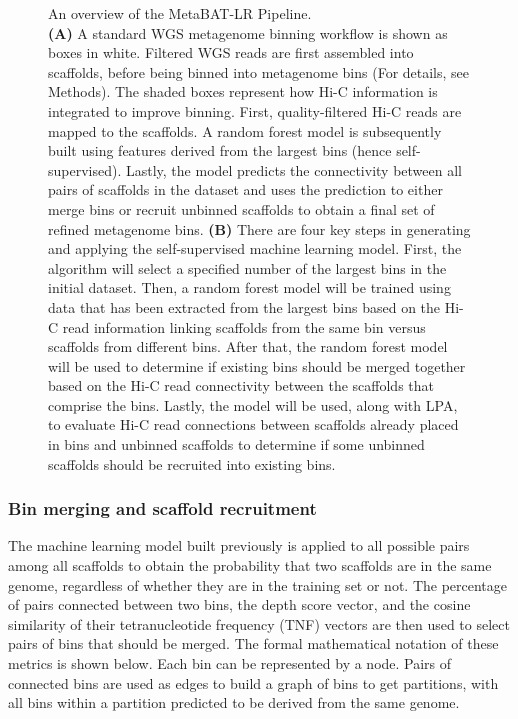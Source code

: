 \documentclass[fleqn,10pt,lineno]{wlpeerj}
\begin{document}
\begin{figure}
\begin{minipage}[b]{0.75\textwidth}
        \label{fig:sub2}
    \end{minipage}
    \caption{An overview of the MetaBAT-LR Pipeline.\\ \textbf{(A)} A standard WGS metagenome binning workflow is shown as boxes in white. Filtered WGS reads are first assembled into scaffolds, before being binned into metagenome bins (For details, see Methods). The shaded boxes represent how Hi-C information is integrated to improve binning. First, quality-filtered Hi-C reads are mapped to the scaffolds. A random forest model is subsequently built using features derived from the largest bins (hence self-supervised). Lastly, the model predicts the connectivity between all pairs of scaffolds in the dataset and uses the prediction to either merge bins or recruit unbinned scaffolds to obtain a final set of refined metagenome bins. \textbf{(B)} There are four key steps in generating and applying the self-supervised machine learning model. First, the algorithm will select a specified number of the largest bins in the initial dataset. Then, a random forest model will be trained using data that has been extracted from the largest bins based on the Hi-C read information linking scaffolds from the same bin versus scaffolds from different bins. After that, the random forest model will be used to determine if existing bins should be merged together based on the Hi-C read connectivity between the scaffolds that comprise the bins. Lastly, the model will be used, along with LPA, to evaluate Hi-C read connections between scaffolds already placed in bins and unbinned scaffolds to determine if some unbinned scaffolds should be recruited into existing bins.}
    \label{fig:pipeline}
\end{figure}

\subsubsection*{Bin merging and scaffold recruitment}

The machine learning model built previously is applied to all possible pairs among all scaffolds to obtain the probability that two scaffolds are in the same genome, regardless of whether they are in the training set or not. The percentage of pairs connected between two bins, the depth score vector, and the cosine similarity of their tetranucleotide frequency (TNF) vectors are then used to select pairs of bins that should be merged. The formal mathematical notation of these metrics is shown below. Each bin can be represented by a node. Pairs of connected bins are used as edges to build a graph of bins to get partitions, with all bins within a partition predicted to be derived from the same genome.
\end{document}
